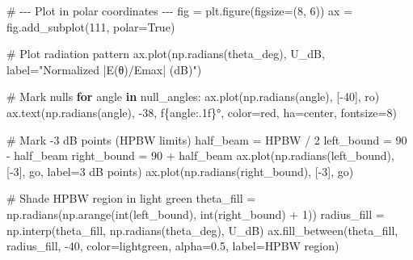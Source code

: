 \documentclass[
  letterpaper,
  DIV=11,
  numbers=noendperiod]{scrartcl}
\newenvironment{Shaded}{\begin{snugshade}}{\end{snugshade}}
\newcommand{\BuiltInTok}[1]{\textcolor[rgb]{0.00,0.23,0.31}{#1}}
\newcommand{\CommentTok}[1]{\textcolor[rgb]{0.37,0.37,0.37}{#1}}
\newcommand{\ControlFlowTok}[1]{\textcolor[rgb]{0.00,0.23,0.31}{\textbf{#1}}}
\newcommand{\DecValTok}[1]{\textcolor[rgb]{0.68,0.00,0.00}{#1}}
\newcommand{\FloatTok}[1]{\textcolor[rgb]{0.68,0.00,0.00}{#1}}
\newcommand{\KeywordTok}[1]{\textcolor[rgb]{0.00,0.23,0.31}{\textbf{#1}}}
\newcommand{\NormalTok}[1]{\textcolor[rgb]{0.00,0.23,0.31}{#1}}
\newcommand{\OperatorTok}[1]{\textcolor[rgb]{0.37,0.37,0.37}{#1}}
\newcommand{\SpecialCharTok}[1]{\textcolor[rgb]{0.37,0.37,0.37}{#1}}
\newcommand{\SpecialStringTok}[1]{\textcolor[rgb]{0.13,0.47,0.30}{#1}}
\newcommand{\StringTok}[1]{\textcolor[rgb]{0.13,0.47,0.30}{#1}}
\newcommand{\VariableTok}[1]{\textcolor[rgb]{0.07,0.07,0.07}{#1}}
\begin{document}
\begin{Shaded}
\begin{Highlighting}[]
\CommentTok{\# {-}{-}{-} Plot in polar coordinates {-}{-}{-}}
\NormalTok{fig }\OperatorTok{=}\NormalTok{ plt.figure(figsize}\OperatorTok{=}\NormalTok{(}\DecValTok{8}\NormalTok{, }\DecValTok{6}\NormalTok{))}
\NormalTok{ax }\OperatorTok{=}\NormalTok{ fig.add\_subplot(}\DecValTok{111}\NormalTok{, polar}\OperatorTok{=}\VariableTok{True}\NormalTok{)}

\CommentTok{\# Plot radiation pattern}
\NormalTok{ax.plot(np.radians(theta\_deg), U\_dB, label}\OperatorTok{=}\StringTok{"Normalized |E(θ)/Emax| (dB)"}\NormalTok{)}

\CommentTok{\# Mark nulls}
\ControlFlowTok{for}\NormalTok{ angle }\KeywordTok{in}\NormalTok{ null\_angles:}
\NormalTok{    ax.plot(np.radians(angle), [}\OperatorTok{{-}}\DecValTok{40}\NormalTok{], }\StringTok{\textquotesingle{}ro\textquotesingle{}}\NormalTok{)}
\NormalTok{    ax.text(np.radians(angle), }\OperatorTok{{-}}\DecValTok{38}\NormalTok{, }\SpecialStringTok{f\textquotesingle{}}\SpecialCharTok{\{}\NormalTok{angle}\SpecialCharTok{:.1f\}}\SpecialStringTok{°\textquotesingle{}}\NormalTok{, color}\OperatorTok{=}\StringTok{\textquotesingle{}red\textquotesingle{}}\NormalTok{, ha}\OperatorTok{=}\StringTok{\textquotesingle{}center\textquotesingle{}}\NormalTok{, fontsize}\OperatorTok{=}\DecValTok{8}\NormalTok{)}

\CommentTok{\# Mark {-}3 dB points (HPBW limits)}
\NormalTok{half\_beam }\OperatorTok{=}\NormalTok{ HPBW }\OperatorTok{/} \DecValTok{2}
\NormalTok{left\_bound }\OperatorTok{=} \DecValTok{90} \OperatorTok{{-}}\NormalTok{ half\_beam}
\NormalTok{right\_bound }\OperatorTok{=} \DecValTok{90} \OperatorTok{+}\NormalTok{ half\_beam}
\NormalTok{ax.plot(np.radians(left\_bound), [}\OperatorTok{{-}}\DecValTok{3}\NormalTok{], }\StringTok{\textquotesingle{}go\textquotesingle{}}\NormalTok{, label}\OperatorTok{=}\StringTok{\textquotesingle{}{-}3 dB points\textquotesingle{}}\NormalTok{)}
\NormalTok{ax.plot(np.radians(right\_bound), [}\OperatorTok{{-}}\DecValTok{3}\NormalTok{], }\StringTok{\textquotesingle{}go\textquotesingle{}}\NormalTok{)}

\CommentTok{\# Shade HPBW region in light green}
\NormalTok{theta\_fill }\OperatorTok{=}\NormalTok{ np.radians(np.arange(}\BuiltInTok{int}\NormalTok{(left\_bound), }\BuiltInTok{int}\NormalTok{(right\_bound) }\OperatorTok{+} \DecValTok{1}\NormalTok{))}
\NormalTok{radius\_fill }\OperatorTok{=}\NormalTok{ np.interp(theta\_fill, np.radians(theta\_deg), U\_dB)}
\NormalTok{ax.fill\_between(theta\_fill, radius\_fill, }\OperatorTok{{-}}\DecValTok{40}\NormalTok{, color}\OperatorTok{=}\StringTok{\textquotesingle{}lightgreen\textquotesingle{}}\NormalTok{, alpha}\OperatorTok{=}\FloatTok{0.5}\NormalTok{, label}\OperatorTok{=}\StringTok{\textquotesingle{}HPBW region\textquotesingle{}}\NormalTok{)}


\end{Highlighting}
\end{Shaded}
\end{document}
